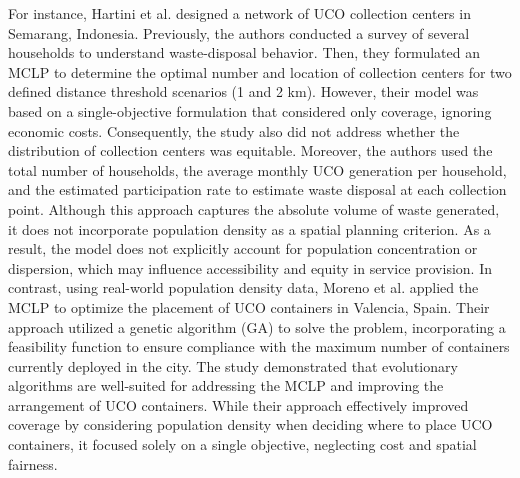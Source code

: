 For instance, Hartini et al. \cite{hartini2021design} designed a network of UCO collection centers in Semarang, Indonesia. Previously, the authors conducted a survey of several households to understand waste-disposal behavior. Then, they formulated an MCLP to determine the optimal number and location of collection centers for two defined distance threshold scenarios (1 and 2 km). However, their model was based on a single-objective formulation that considered only coverage, ignoring economic costs. Consequently, the study also did not address whether the distribution of collection centers was equitable. Moreover, the authors used the total number of households, the average monthly UCO generation per household, and the estimated participation rate to estimate waste disposal at each collection point. Although this approach captures the absolute volume of waste generated, it does not incorporate population density as a spatial planning criterion. As a result, the model does not explicitly account for population concentration or dispersion, which may influence accessibility and equity in service provision.
In contrast, using real-world population density data, Moreno et al. \cite{moreno2024optimizing} applied the MCLP to optimize the placement of UCO containers in Valencia, Spain. Their approach utilized a genetic algorithm (GA) to solve the problem, incorporating a feasibility function to ensure compliance with the maximum number of containers currently deployed in the city. The study demonstrated that evolutionary algorithms are well-suited for addressing the MCLP and improving the arrangement of UCO containers. While their approach effectively improved coverage by considering population density when deciding where to place UCO containers, it focused solely on a single objective, neglecting cost and spatial fairness. 

